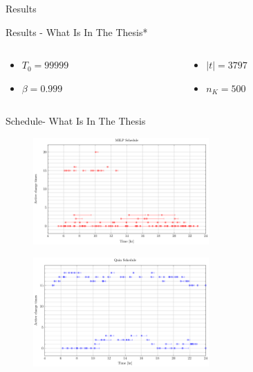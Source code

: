 \documentclass[aspectratio=169]{beamer}
\begin{document}
\begin{frame}[label={sec:org4ee59dd}]{Results}
\begin{frame}[label={sec:org45c4322}]{Results - What Is In The Thesis*}
\begin{columns}
\begin{column}{0.5\columnwidth}
\begin{itemize}
\item \(T_0 = 99999\)
\item \(\beta = 0.999\)
\end{itemize}
\end{column}
\begin{column}{0.5\columnwidth}
\begin{itemize}
\item \(|t| = 3797\)
\item \(n_K = 500\)
\end{itemize}
\end{column}
\end{columns}
\end{frame}

\begin{frame}[label={sec:org58e1190}]{Schedule- What Is In The Thesis}
\begin{figure}[htpb]
\centering
    \includegraphics[width=0.6\textwidth]{img/sa-pap-paper-bad/schedule-milp}
\end{figure}
\begin{figure}[htpb]
\centering
    \includegraphics[width=0.6\textwidth]{img/sa-pap-paper-bad/schedule-quinn}
\end{figure}
\end{frame}


\end{frame}
\end{document}
